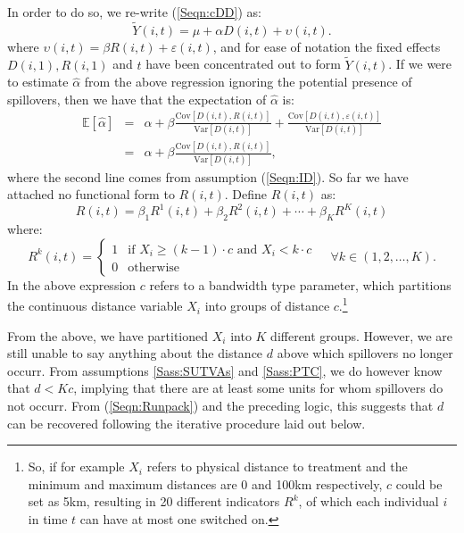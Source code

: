 \documentclass{article}
\newcommand{\Var}{\mathrm{Var}}
\newcommand{\Cov}{\mathrm{Cov}}
\newcommand{\Bias}[2]{\frac{\Cov[#1,#2]}{\Var[#1]}}
\begin{document}
\begin{spacing}{1.1}
In order to do so, we re-write (\ref{Seqn:cDD}) as:
\begin{equation}
\label{Seqn:cDDconc}
\tilde{Y}(i,t)=\mu + \alpha D(i,t) + \upsilon(i,t).
\end{equation}
where $\upsilon(i,t)=\beta R(i,t)+\varepsilon(i,t)$, and for ease of notation
the fixed effects $D(i,1), R(i,1)$ and $t$ have been concentrated out to form
$\tilde{Y}(i,t)$.  If we were to estimate $\hat\alpha$ from the above regression
ignoring the potential presence of spillovers, then we have that the 
expectation of $\hat\alpha$ is:
\begin{eqnarray}
\label{Seqn:alphaExp}
\mathbb{E}[\hat\alpha] &=& \alpha + \beta\Bias{D(i,t)}{R(i,t)}+\Bias{D(i,t)}{\varepsilon(i,t)} \nonumber \\ 
              &=& \alpha + \beta\Bias{D(i,t)}{R(i,t)},
\end{eqnarray}
where the second line comes from assumption (\ref{Seqn:ID}).  So far we have
attached no functional form to $R(i,t)$.  Define $R(i,t)$ as:
\begin{equation}
\label{Seqn:Runpack}
R(i,t) = \beta_1R^1(i,t)+\beta_2R^2(i,t)+ \cdots + \beta_KR^K(i,t)
\end{equation}  
where:
\begin{equation}
 R^k(i,t) =
  \begin{cases}
   1   & \text{if\ \ } X_i\geq(k-1)\cdot c \text{\ \ and \ } X_i<k\cdot c \\
   0   & \text{otherwise} 
  \end{cases}\ \ \ \ \ \forall k \in (1,2,\ldots,K).
\end{equation}
In the above expression $c$ refers to a bandwidth type parameter, which partitions
the continuous distance variable $X_i$ into groups of distance $c$.\footnote{So, if
for example $X_i$ refers to physical distance to treatment and the minimum and 
maximum distances are 0 and 100km respectively, $c$ could be set as 5km, resulting
in 20 different indicators $R^k$, of which each individual $i$ in time $t$ can
have at most one switched on.}

From the above, we have partitioned $X_i$ into $K$ different groups.  However, we
are still unable to say anything about the distance $d$ above which spillovers no 
longer occurr.  From assumptions \ref{Sass:SUTVAs} and \ref{Sass:PTC}, we do however
know that $d<Kc$, implying that there are at least some units for whom spillovers
do not occurr.  From (\ref{Seqn:Runpack}) and the preceding logic, this suggests
that $d$ can be recovered following the iterative procedure laid out below.


\end{spacing}
\end{document}
